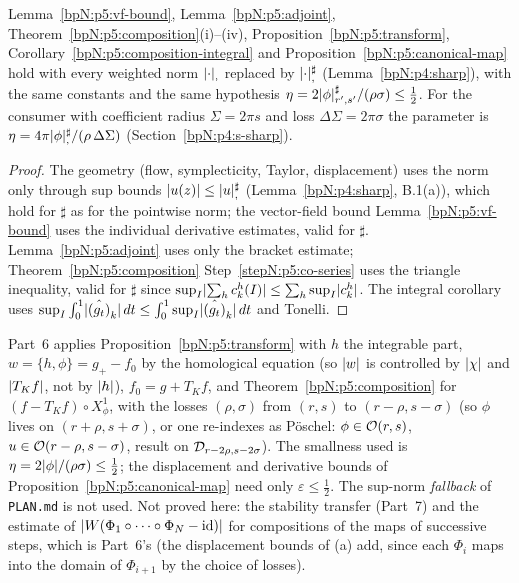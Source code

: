 \begin{proposition}\label{bpN:p5:sharp-composition}
Lemma~\ref{bpN:p5:vf-bound}, Lemma~\ref{bpN:p5:adjoint}, Theorem~\ref{bpN:p5:composition}(i)--(iv), Proposition~\ref{bpN:p5:transform}, Corollary~\ref{bpN:p5:composition-integral} and Proposition~\ref{bpN:p5:canonical-map} hold with every weighted norm $\lvert \cdot\rvert_{,}$ replaced by $\lvert \cdot\rvert_{,}^\sharp$ (Lemma~\ref{bpN:p4:sharp}), with the same constants and the same hypothesis $\eta=2\lvert \phi\rvert_{r',s'}^\sharp/(\rho\sigma)\le\frac12$.
For the consumer with coefficient radius $\Sigma=2\pi s$ and loss $\Delta\Sigma=2\pi\sigma$ the parameter is $\eta=4\pi\lvert \phi\rvert_{,}^\sharp/(\rho\,\Delta\Sigma)$ (Section~\ref{bpN:p4:s-sharp}).
\end{proposition}
\begin{proof}
\label{stepN:p5:sh-where} The geometry (flow, symplecticity, Taylor, displacement) uses the norm only through sup bounds $\lvert u(z)\rvert\le\lvert u\rvert_{,}^\sharp$ (Lemma~\ref{bpN:p4:sharp}, B.1(a)), which hold for $\sharp$ as for the pointwise norm; the vector-field bound Lemma~\ref{bpN:p5:vf-bound} uses the individual derivative estimates, valid for $\sharp$.
\label{stepN:p5:sh-series} Lemma~\ref{bpN:p5:adjoint} uses only the bracket estimate; Theorem~\ref{bpN:p5:composition} Step~\ref{stepN:p5:co-series} uses the triangle inequality, valid for $\sharp$ since $\sup_I\lvert \sum_hc^h_k(I)\rvert\le\sum_h\sup_I\lvert c^h_k\rvert$. The integral corollary uses $\sup_I\int_0^1\lvert \hat{(g_t)}_k\rvert\,dt\le\int_0^1\sup_I\lvert \hat{(g_t)}_k\rvert\,dt$ and Tonelli.
\end{proof}

\begin{remark}\label{bpN:p5:use}
Part~6 applies Proposition~\ref{bpN:p5:transform} with $h$ the integrable part, $w=\{h,\phi\}=g_+-f_0$ by the homological equation (so $\lvert w\rvert$ is controlled by $\lvert \chi\rvert$ and $\lvert T_Kf\rvert$, not by $\lvert h\rvert$), $f_0=g+T_Kf$, and Theorem~\ref{bpN:p5:composition} for $(f-T_Kf)\circ X^1_\phi$, with the losses
$(\rho,\sigma)$ from $(r,s)$ to $(r-\rho,s-\sigma)$ (so $\phi$ lives on $(r+\rho,s+\sigma)$, or one re-indexes as P\"oschel: $\phi\in\mathcal O(r,s)$, $u\in\mathcal O(r-\rho,s-\sigma)$, result on $\mathcal D_{r-2\rho,s-2\sigma}$). The smallness used is $\eta=2\lvert \phi\rvert/(\rho\sigma)\le\frac12$; the displacement and derivative bounds of Proposition~\ref{bpN:p5:canonical-map} need only $\varepsilon\le\frac12$.
The sup-norm \emph{fallback} of \texttt{PLAN.md} is not used. Not proved here: the stability transfer (Part~7) and the estimate of $\lvert W(\Phi_1\circ\dots\circ\Phi_N-\mathrm{id})\rvert$ for compositions of the maps of successive steps, which is Part~6's (the displacement bounds of (a) add, since each $\Phi_i$ maps into the domain of $\Phi_{i+1}$ by the choice of losses).
\end{remark}
\endgroup
